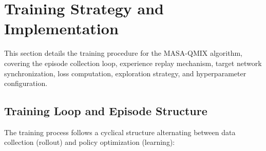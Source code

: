 \section{Training Strategy and Implementation}
\label{sec:training_strategy}

This section details the training procedure for the MASA-QMIX algorithm, covering the episode collection loop, experience replay mechanism, target network synchronization, loss computation, exploration strategy, and hyperparameter configuration.

\subsection{Training Loop and Episode Structure}
\label{sec:training_loop}

The training process follows a cyclical structure alternating between data collection (rollout) and policy optimization (learning):


